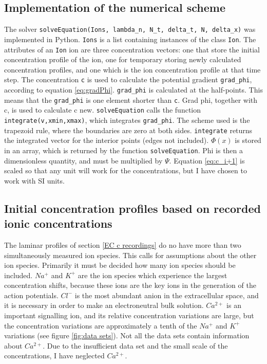 \documentclass{article}
\begin{document}
\subsection{Implementation of the numerical scheme}
The solver \texttt{solveEquation(Ions, lambda\_n, N\_t, delta\_t, N, delta\_x)} was implemented in Python.  \texttt{Ions} is a list containing instances of the class \texttt{Ion}. The attributes of an \texttt{Ion} ion are three concentration vectors: one that store the initial concentration profile of the ion, one for temporary storing newly calculated concentration profiles, and one which is the ion concentration profile at that time step. The concentration \texttt{c} is used to calculate the potential gradient \texttt{grad\_phi}, according to equation \ref{eq:gradPhi}. \texttt{grad\_phi} is calculated at the half-points. This means that the \texttt{grad\_phi} is one element shorter than \texttt{c}.   Grad phi, together with c, is used to calculate c new. \texttt{solveEquation} calls the function \texttt{integrate(v,xmin,xmax)}, which integrates \texttt{grad\_phi}. The scheme used is the trapezoid rule, where the boundaries are zero at both sides. \texttt{integrate} returns the integrated vector for the interior points (edges not included). $\Phi(x)$ is stored in an array, which is returned by the function \texttt{solveEquation}. Phi is then a dimensionless quantity, and must be multiplied by $\Psi$. Equation \ref{eq:c_i+1} is scaled so that any unit will work for the concentrations, but I have chosen to work with SI units. 

\subsection{Initial concentration profiles based on recorded ionic concentrations}\label{Initial concentration profiles}
The laminar profiles of section \ref{EC c recordings} do no have more than two simultaneously measured ion species. This calls for assumptions about the other ion species. Primarily it must be decided how many ion species should be included. $Na^+$ and $K^+$ are the ion species which experience the largest concentration shifts, because these ions are the key ions in the generation of the action potentials. $Cl^-$ is the most abundant anion in the extracellular space, and it is necessary in order to make an electroneutral bulk solution. $Ca^{2+}$ is an important signalling ion, and its relative concentration variations are large, but the concentration variations are approximately a tenth of the $Na^+$ and $K^+$ variations (see figure \ref{fig:data sets}). Not all the data sets contain information about $Ca^{2+}$. Due to the insufficient data set and the small scale of the concentrations, I have neglected $Ca^{2+}$.  
\end{document}
